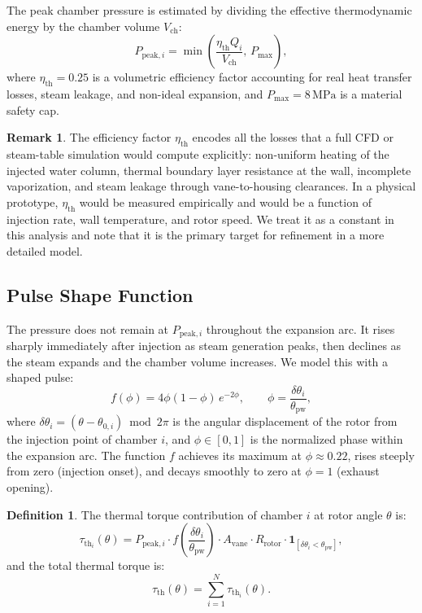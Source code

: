 \documentclass[11pt, a4paper]{article}
\theoremstyle{plain}
\theoremstyle{definition}
\newtheorem{definition}[theorem]{Definition}
\newtheorem{remark}[theorem]{Remark}
\newcommand{\tauth}{\tau_{\mathrm{th}}}
\newcommand{\Nch}{N}
\begin{document}
The peak chamber pressure is estimated by dividing the effective thermodynamic energy by the chamber volume $V_{\mathrm{ch}}$:
\begin{equation}
  P_{\mathrm{peak},i} = \min\!\left(\frac{\eta_{\mathrm{th}} Q_i}{V_{\mathrm{ch}}},\, P_{\mathrm{max}}\right),
  \label{eq:Ppeak}
\end{equation}
where $\eta_{\mathrm{th}} = 0.25$ is a volumetric efficiency factor accounting for real heat transfer losses, steam leakage, and non-ideal expansion, and $P_{\mathrm{max}} = 8\,\mathrm{MPa}$ is a material safety cap.

\begin{remark}
The efficiency factor $\eta_{\mathrm{th}}$ encodes all the losses that a full CFD or steam-table simulation would compute explicitly: non-uniform heating of the injected water column, thermal boundary layer resistance at the wall, incomplete vaporization, and steam leakage through vane-to-housing clearances. In a physical prototype, $\eta_{\mathrm{th}}$ would be measured empirically and would be a function of injection rate, wall temperature, and rotor speed. We treat it as a constant in this analysis and note that it is the primary target for refinement in a more detailed model.
\end{remark}

\subsection{Pulse Shape Function}

The pressure does not remain at $P_{\mathrm{peak},i}$ throughout the expansion arc. It rises sharply immediately after injection as steam generation peaks, then declines as the steam expands and the chamber volume increases. We model this with a shaped pulse:
\begin{equation}
  f(\phi) = 4\phi(1-\phi)\,e^{-2\phi}, \qquad \phi = \frac{\delta\theta_i}{\theta_{\mathrm{pw}}},
  \label{eq:pulse}
\end{equation}
where $\delta\theta_i = (\theta - \theta_{0,i}) \bmod 2\pi$ is the angular displacement of the rotor from the injection point of chamber $i$, and $\phi \in [0,1]$ is the normalized phase within the expansion arc. The function $f$ achieves its maximum at $\phi \approx 0.22$, rises steeply from zero (injection onset), and decays smoothly to zero at $\phi = 1$ (exhaust opening).

\begin{definition}
The thermal torque contribution of chamber $i$ at rotor angle $\theta$ is:
\begin{equation}
  \tauth_i(\theta) = P_{\mathrm{peak},i} \cdot f\!\left(\frac{\delta\theta_i}{\theta_{\mathrm{pw}}}\right) \cdot A_{\mathrm{vane}} \cdot R_{\mathrm{rotor}} \cdot \mathbf{1}_{[\delta\theta_i < \theta_{\mathrm{pw}}]},
\end{equation}
and the total thermal torque is:
\begin{equation}
  \tauth(\theta) = \sum_{i=1}^{\Nch} \tauth_i(\theta).
  \label{eq:tautherm}
\end{equation}
\end{definition}
\end{document}
